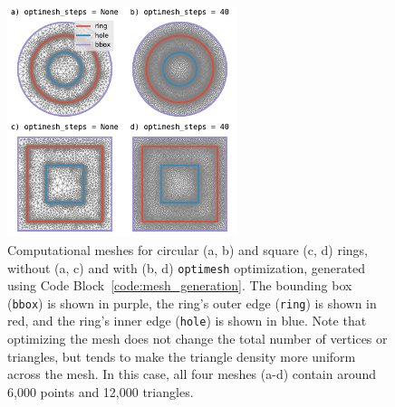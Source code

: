 \documentclass[final,3p,times]{elsarticle}
\newcommand{\inline}[1]{\texttt{#1}\xspace}
\begin{document}
\begin{figure}[h]
    \centering
    \includegraphics[width=0.6\textwidth]{examples/images/mesh.pdf}
    \caption{Computational meshes for circular (a, b) and square (c, d) rings, without (a, c) and with (b, d) \inline{optimesh} optimization, generated using Code Block~\ref{code:mesh_generation}. The bounding box (\inline{bbox}) is shown in purple, the ring's outer edge (\inline{ring}) is shown in red, and the ring's inner edge (\inline{hole}) is shown in blue. Note that optimizing the mesh does not change the total number of vertices or triangles, but tends to make the triangle density more uniform across the mesh. In this case, all four meshes (a-d) contain around 6,000 points and 12,000 triangles.}
    \label{fig:mesh}
\end{figure}


\end{document}
